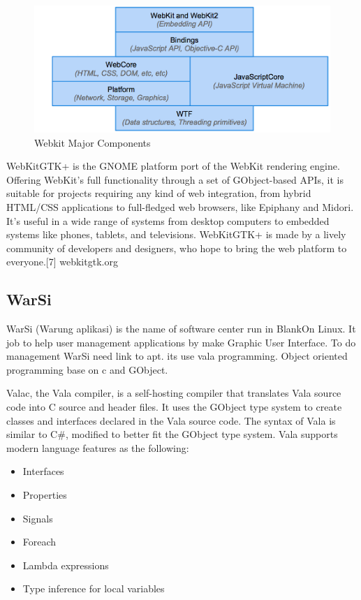 \documentclass[conference, letterpaper]{IEEEtran}
\begin{document}
\begin{figure}[hbtp]
\centering
\includegraphics[scale=0.5]{image/webkitcomponents.png}
\caption{Webkit Major Components}
\end{figure}

WebKitGTK+ is the GNOME platform port of the WebKit rendering engine. Offering WebKit’s full functionality through a set of GObject-based APIs, it is suitable for projects requiring any kind of web integration, from hybrid HTML/CSS applications to full-fledged web browsers, like Epiphany and Midori. It’s useful in a wide range of systems from desktop computers to embedded systems like phones, tablets, and televisions. WebKitGTK+ is made by a lively community of developers and designers, who hope to bring the web platform to everyone.[7] webkitgtk.org

\subsection{WarSi}
WarSi (Warung aplikasi) is the name of software center run in BlankOn Linux. It job to help user management applications by make Graphic User Interface. To do management WarSi need link to apt. its use vala programming. Object oriented programming base on c and GObject. 

Valac, the Vala compiler, is a self-hosting compiler that translates Vala source code into C source and header files. It uses the GObject type system to create classes and interfaces declared in the Vala source code. The syntax of Vala is similar to C\#, modified to better fit the GObject type system. Vala supports modern language features as the following:

\begin{itemize}
\item Interfaces
\item Properties
\item Signals
\item Foreach
\item Lambda expressions
\item Type inference for local variables
\end{itemize}
\end{document}

